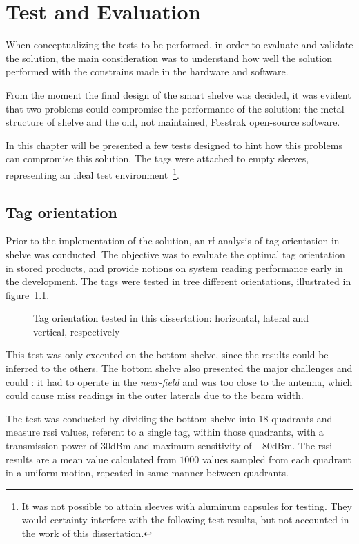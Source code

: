 \chapter{Test and Evaluation} \label{sec:tests}

When conceptualizing the tests to be performed, in order to evaluate and validate the solution, the main consideration was to understand how well the solution performed with the constrains made in the hardware and software.

From the moment the final design of the smart shelve was decided, it was evident that two problems could compromise the performance of the solution: the metal structure of shelve and the old, not maintained, Fosstrak open-source software.

In this chapter will be presented a few tests designed to hint how this problems can compromise this solution. The tags were attached to empty sleeves, representing an ideal test environment~\footnote{It was not possible to attain sleeves with aluminum capsules for testing. They would certainty interfere with the following test results, but not accounted in the work of this dissertation.}.

\section{Tag orientation} \label{sec:test1}

Prior to the implementation of the solution, an \ac{rf} analysis of tag orientation in shelve was conducted.
The objective was to evaluate the optimal tag orientation in stored products, and provide notions on system reading performance early in the development.
The tags were tested in tree different orientations, illustrated in figure~\ref{fig:tagorientations}.

\begin{figure}
    \centering
    \caption{Tag orientation tested in this dissertation: horizontal, lateral and vertical, respectively}
    \label{fig:tagorientations}
\end{figure}


This test was only executed on the bottom shelve, since the results could be inferred to the others. The bottom shelve also presented the major challenges and could : it had to operate in the \emph{near-field} and was too close to the antenna, which could cause miss readings in the outer laterals due to the beam width.

The test was conducted by dividing the bottom shelve into $18$ quadrants and measure \ac{rssi} values, referent to a single tag, within those quadrants, with a transmission power of $30$dBm and maximum sensitivity of $-80$dBm. The \ac{rssi} results are a mean value calculated from $1000$ values sampled from each quadrant in a uniform motion, repeated in same manner between quadrants.

